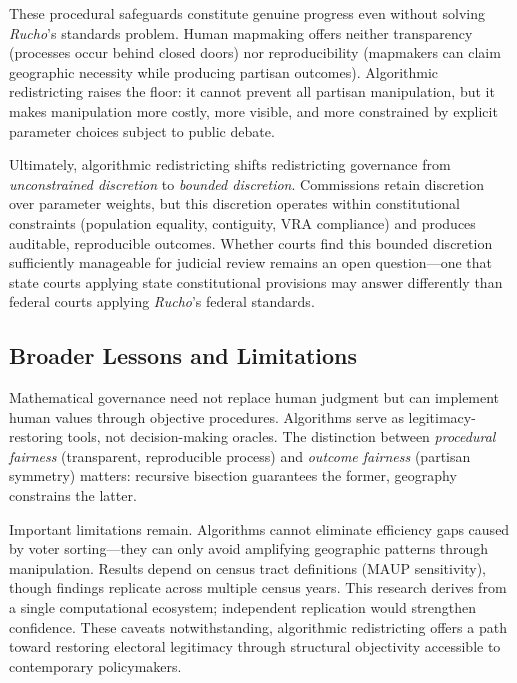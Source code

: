 These procedural safeguards constitute genuine progress even without solving \emph{Rucho}'s standards problem. Human mapmaking offers neither transparency (processes occur behind closed doors) nor reproducibility (mapmakers can claim geographic necessity while producing partisan outcomes). Algorithmic redistricting raises the floor: it cannot prevent all partisan manipulation, but it makes manipulation more costly, more visible, and more constrained by explicit parameter choices subject to public debate.

Ultimately, algorithmic redistricting shifts redistricting governance from \emph{unconstrained discretion} to \emph{bounded discretion}. Commissions retain discretion over parameter weights, but this discretion operates within constitutional constraints (population equality, contiguity, VRA compliance) and produces auditable, reproducible outcomes. Whether courts find this bounded discretion sufficiently manageable for judicial review remains an open question---one that state courts applying state constitutional provisions may answer differently than federal courts applying \emph{Rucho}'s federal standards.

\subsection{Broader Lessons and Limitations}

Mathematical governance need not replace human judgment but can implement human values through objective procedures. Algorithms serve as legitimacy-restoring tools, not decision-making oracles. The distinction between \emph{procedural fairness} (transparent, reproducible process) and \emph{outcome fairness} (partisan symmetry) matters: recursive bisection guarantees the former, geography constrains the latter.

Important limitations remain. Algorithms cannot eliminate efficiency gaps caused by voter sorting---they can only avoid amplifying geographic patterns through manipulation. Results depend on census tract definitions (MAUP sensitivity), though findings replicate across multiple census years. This research derives from a single computational ecosystem; independent replication would strengthen confidence. These caveats notwithstanding, algorithmic redistricting offers a path toward restoring electoral legitimacy through structural objectivity accessible to contemporary policymakers.

